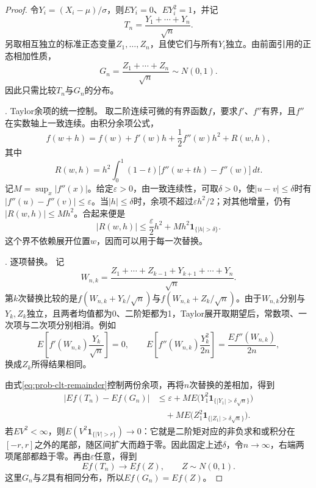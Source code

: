 \begin{proof}
令\(Y_i=(X_i-\mu)/\sigma\)，则\(EY_i=0\)、\(EY_i^2=1\)，并记
\[
 T_n=\frac{Y_1+\cdots+Y_n}{\sqrt n}.
\]
另取相互独立的标准正态变量\(Z_1,\ldots,Z_n\)，且使它们与所有\(Y_i\)独立。由前面引用的正态相加性质，
\[
 G_n=\frac{Z_1+\cdots+Z_n}{\sqrt n}\sim N(0,1).
\]
因此只需比较\(T_n\)与\(G_n\)的分布。

\smallskip
{. Taylor余项的统一控制。}
取二阶连续可微的有界函数\(f\)，要求\(f'\)、\(f''\)有界，且\(f''\)在实数轴上一致连续。由积分余项公式，
\[
 f(w+h)=f(w)+f'(w)h+\frac12f''(w)h^2+R(w,h),
\]
其中
\[
 R(w,h)=h^2\int_0^1(1-t)\bigl[f''(w+th)-f''(w)\bigr]\,dt.
\]
记\(M=\sup_x|f''(x)|\)。给定\(\varepsilon>0\)，由一致连续性，可取\(\delta>0\)，使\(|u-v|\le\delta\)时有\(|f''(u)-f''(v)|\le\varepsilon\)。当\(|h|\le\delta\)时，余项不超过\(\varepsilon h^2/2\)；对其他增量，仍有\(|R(w,h)|\le Mh^2\)。合起来便是
\begin{equation}\label{eq:prob-clt-remainder}
 |R(w,h)|\le\frac{\varepsilon}{2}h^2
 +Mh^2\mathbf1_{\{|h|>\delta\}}.
\end{equation}
这个界不依赖展开位置\(w\)，因而可以用于每一次替换。

\smallskip
{. 逐项替换。}
记
\[
 W_{n,k}=\frac{Z_1+\cdots+Z_{k-1}+Y_{k+1}+\cdots+Y_n}{\sqrt n}.
\]
第\(k\)次替换比较的是\(f(W_{n,k}+Y_k/\sqrt n)\)与\(f(W_{n,k}+Z_k/\sqrt n)\)。由于\(W_{n,k}\)分别与\(Y_k,Z_k\)独立，且两者均值都为0、二阶矩都为1，Taylor展开取期望后，常数项、一次项与二次项分别相消。例如
\[
 E\left[f'(W_{n,k})\frac{Y_k}{\sqrt n}\right]=0,\qquad
 E\left[f''(W_{n,k})\frac{Y_k^2}{2n}\right]
 =\frac{E f''(W_{n,k})}{2n},
\]
换成\(Z_k\)所得结果相同。

由式\eqref{eq:prob-clt-remainder}控制两份余项，再将\(n\)次替换的差相加，得到
\begin{align*}
 |Ef(T_n)-Ef(G_n)|
 &\le\varepsilon
 +M E\bigl(Y_1^2\mathbf1_{\{|Y_1|>\delta\sqrt n\}}\bigr)\\
 &\quad+M E\bigl(Z_1^2\mathbf1_{\{|Z_1|>\delta\sqrt n\}}\bigr).
\end{align*}
若\(EV^2<\infty\)，则\(E(V^2\mathbf1_{\{|V|>r\}})\to0\)：它就是二阶矩对应的非负求和或积分在\([-r,r]\)之外的尾部，随区间扩大而趋于零。因此固定上述\(\delta\)，令\(n\to\infty\)，右端两项尾部都趋于零。再由\(\varepsilon\)任意，得到
\begin{equation}\label{eq:prob-clt-smooth}
 Ef(T_n)\longrightarrow Ef(Z),\qquad Z\sim N(0,1).
\end{equation}
这里\(G_n\)与\(Z\)具有相同分布，所以\(Ef(G_n)=Ef(Z)\)。


\end{proof}
